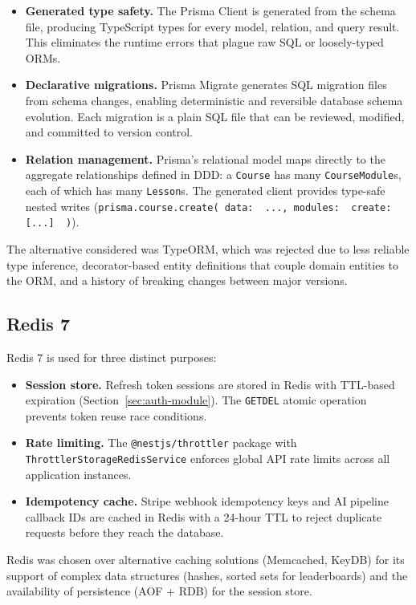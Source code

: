 \begin{itemize}
  \item \textbf{Generated type safety.} The Prisma Client is generated from the schema file, producing TypeScript types for every model, relation, and query result. This eliminates the runtime errors that plague raw SQL or loosely-typed ORMs.
  \item \textbf{Declarative migrations.} Prisma Migrate generates SQL migration files from schema changes, enabling deterministic and reversible database schema evolution. Each migration is a plain SQL file that can be reviewed, modified, and committed to version control.
  \item \textbf{Relation management.} Prisma's relational model maps directly to the aggregate relationships defined in DDD: a \texttt{Course} has many \texttt{CourseModule}s, each of which has many \texttt{Lesson}s. The generated client provides type-safe nested writes (\texttt{prisma.course.create({ data: { ..., modules: { create: [...] }} })}).
\end{itemize}

The alternative considered was TypeORM, which was rejected due to less reliable type inference, decorator-based entity definitions that couple domain entities to the ORM, and a history of breaking changes between major versions.

\subsection{Redis 7}
\label{subsec:app-redis}

Redis 7 is used for three distinct purposes:

\begin{itemize}
  \item \textbf{Session store.} Refresh token sessions are stored in Redis with TTL-based expiration (Section~\ref{sec:auth-module}). The \texttt{GETDEL} atomic operation prevents token reuse race conditions.
  \item \textbf{Rate limiting.} The \texttt{@nestjs/throttler} package with \texttt{ThrottlerStorageRedisService} enforces global API rate limits across all application instances.
  \item \textbf{Idempotency cache.} Stripe webhook idempotency keys and AI pipeline callback IDs are cached in Redis with a 24-hour TTL to reject duplicate requests before they reach the database.
\end{itemize}

Redis was chosen over alternative caching solutions (Memcached, KeyDB) for its support of complex data structures (hashes, sorted sets for leaderboards) and the availability of persistence (AOF + RDB) for the session store.

